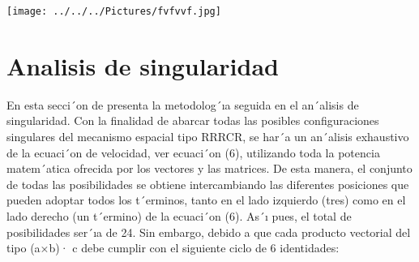 \documentclass[12pt,a4paper]{article}
\begin{document}
\texttt{[image: ../../../Pictures/fvfvvf.jpg]} 
\section{Analisis de singularidad}
En esta secci´on de presenta la metodolog´ıa
seguida en el an´alisis de singularidad. Con la
finalidad de abarcar todas las posibles configuraciones singulares del mecanismo espacial
tipo RRRCR, se har´a un an´alisis exhaustivo
de la ecuaci´on de velocidad, ver ecuaci´on (6),
utilizando toda la potencia matem´atica ofrecida
por los vectores y las matrices.
De esta manera, el conjunto de todas las posibilidades se obtiene intercambiando las diferentes
posiciones que pueden adoptar todos los t´erminos, tanto en el lado izquierdo (tres) como en
el lado derecho (un t´ermino) de la ecuaci´on (6).
As´ı pues, el total de posibilidades ser´ıa de 24. Sin
embargo, debido a que cada producto vectorial del
tipo (a×b)· c debe cumplir con el siguiente ciclo
de 6 identidades:
\end{document}
